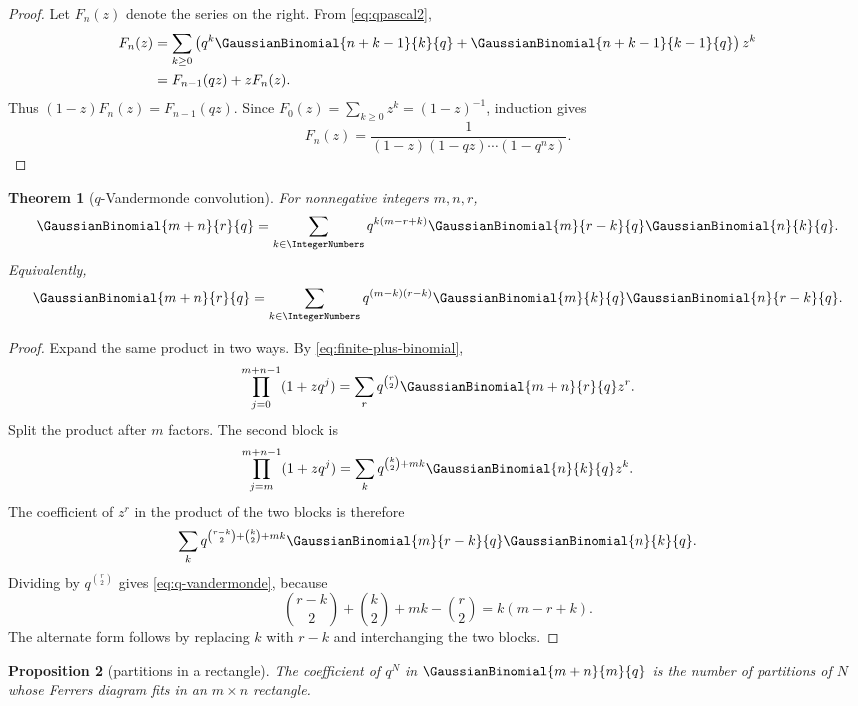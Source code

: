 \documentclass[11pt,oneside]{article}
\newtheorem{theorem}{Theorem}[section]
\newtheorem{proposition}[theorem]{Proposition}
\theoremstyle{definition}
\begin{document}
\begin{proof}
Let $F_n(z)$ denote the series on the right. From \eqref{eq:qpascal2},
\begin{align*}
 F_n(z)
 &=\sum_{k\ge0}\left(q^k\GaussianBinomial{n+k-1}{k}{q}
      +\GaussianBinomial{n+k-1}{k-1}{q}\right)z^k\\
 &=F_{n-1}(qz)+zF_n(z).
\end{align*}
Thus $(1-z)F_n(z)=F_{n-1}(qz)$. Since $F_0(z)=\sum_{k\ge0}z^k=(1-z)^{-1}$, induction gives
\[
 F_n(z)=\frac{1}{(1-z)(1-qz)\cdots(1-q^nz)}.
\]
\end{proof}

\begin{theorem}[$q$-Vandermonde convolution]\label{thm:q-vandermonde}
For nonnegative integers $m,n,r$,
\begin{equation}\label{eq:q-vandermonde}
 \GaussianBinomial{m+n}{r}{q}
 =\sum_{k\in\IntegerNumbers}q^{k(m-r+k)}
   \GaussianBinomial{m}{r-k}{q}\GaussianBinomial{n}{k}{q}.
\end{equation}
Equivalently,
\begin{equation}\label{eq:q-vandermonde-alt}
 \GaussianBinomial{m+n}{r}{q}
 =\sum_{k\in\IntegerNumbers}q^{(m-k)(r-k)}
   \GaussianBinomial{m}{k}{q}\GaussianBinomial{n}{r-k}{q}.
\end{equation}
\end{theorem}

\begin{proof}
Expand the same product in two ways. By \eqref{eq:finite-plus-binomial},
\[
 \prod_{j=0}^{m+n-1}(1+zq^j)
 =\sum_r q^{\binom r2}\GaussianBinomial{m+n}{r}{q}z^r.
\]
Split the product after $m$ factors. The second block is
\[
 \prod_{j=m}^{m+n-1}(1+zq^j)
 =\sum_k q^{\binom k2+mk}\GaussianBinomial{n}{k}{q} z^k.
\]
The coefficient of $z^r$ in the product of the two blocks is therefore
\[
 \sum_k q^{\binom{r-k}2+\binom k2+mk}
 \GaussianBinomial{m}{r-k}{q}\GaussianBinomial{n}{k}{q}.
\]
Dividing by $q^{\binom r2}$ gives \eqref{eq:q-vandermonde}, because
\[
 \binom{r-k}{2}+\binom{k}{2}+mk-\binom r2=k(m-r+k).
\]
The alternate form follows by replacing $k$ with $r-k$ and interchanging the two blocks.
\end{proof}

\begin{proposition}[partitions in a rectangle]\label{prop:rectangle}
The coefficient of $q^N$ in $\GaussianBinomial{m+n}{m}{q}$ is the number of partitions of $N$ whose Ferrers diagram fits in an $m\times n$ rectangle.
\end{proposition}
\end{document}
